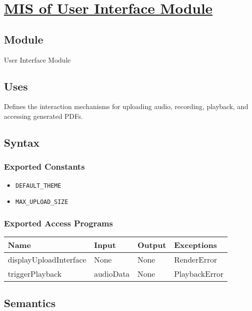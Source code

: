 \documentclass[12pt, titlepage]{article}
\begin{document}
\section{\hyperref[mUI]{MIS of User Interface Module}} \label{M2}  

\subsection{Module}  
User Interface Module  

\subsection{Uses}  
Defines the interaction mechanisms for uploading audio, recording, playback, and accessing generated PDFs.  

\subsection{Syntax}  

\subsubsection{Exported Constants}  
\begin{itemize}
    \item \texttt{DEFAULT\_THEME}  
    \item \texttt{MAX\_UPLOAD\_SIZE}  
\end{itemize}  

\subsubsection{Exported Access Programs}  
\begin{center}  
\begin{tabular}{|p{5cm}|p{2cm}|p{4cm}|p{3cm}|}  
\hline  
\textbf{Name} & \textbf{Input} & \textbf{Output} & \textbf{Exceptions} \\  
\hline  
displayUploadInterface & None & None & RenderError \\  
triggerPlayback & audioData & None & PlaybackError \\  
\hline  
\end{tabular}  
\end{center}  

\subsection{Semantics}  
\end{document}
